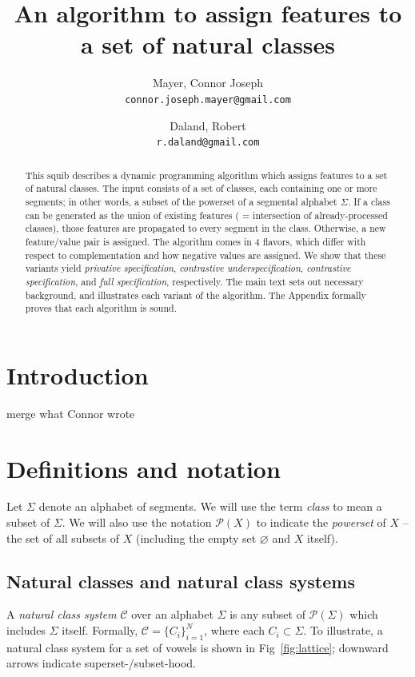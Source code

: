 \documentclass[11pt, oneside]{article}   	%
\title{An algorithm to assign features to a set of natural classes}
\author{}
\author{
  Mayer, Connor Joseph \\
  \texttt{connor.joseph.mayer@gmail.com}
  \and
  Daland, Robert \\
  \texttt{r.daland@gmail.com}
}
\begin{document}
\maketitle

\begin{abstract}
This squib describes a dynamic programming algorithm which assigns features to a set of natural classes. The input consists of a set of classes, each containing one or more segments; in other words, a subset of the powerset of a segmental alphabet $\Sigma$. If a class can be generated as the union of existing features ( = intersection of already-processed classes), those features are propagated to every segment in the class. Otherwise, a new feature/value pair is assigned. The algorithm comes in 4 flavors, which differ with respect to complementation and how negative values are assigned. We show that these variants yield \textit{privative specification}, \textit{contrastive underspecification}, \textit{contrastive specification}, and \textit{full specification}, respectively. The main text sets out necessary background, and illustrates each variant of the algorithm. The Appendix formally proves that each algorithm is sound.
\end{abstract}

\section{Introduction}
merge what Connor wrote

\section{Definitions and notation}

Let $\Sigma$ denote an alphabet of segments. We will use the term \textit{class} to mean a subset of $\Sigma$. We will also use the notation $\mathcal P(X)$ to indicate the \textit{powerset} of $X$ -- the set of all subsets of $X$ (including the empty set $\varnothing$ and $X$ itself).

\subsection{Natural classes and natural class systems}

A \textit{natural class system} $\mathcal C$ over an alphabet $\Sigma$ is any subset of $\mathcal P(\Sigma)$ which includes $\Sigma$ itself. Formally, $\mathcal C = \{ C_i \}_{i=1}^N$, where each $C_i \subset \Sigma$. To illustrate, a natural class system for a set of vowels is shown in Fig~\ref{fig:lattice}; downward arrows indicate superset-/subset-hood.
\end{document}
